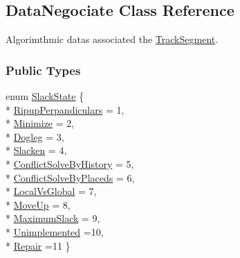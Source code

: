 \hypertarget{classKite_1_1DataNegociate}{\subsection{Data\-Negociate Class Reference}
\label{classKite_1_1DataNegociate}
}


Algorimthmic datas associated the \hyperlink{classKite_1_1TrackSegment}{Track\-Segment}.  


\subsubsection*{Public Types}
\begin{DoxyCompactItemize}
\item 
enum \hyperlink{classKite_1_1DataNegociate_ab7ccb6fc1f298728995250a3bbcf18c7}{Slack\-State} \{ \\*
\hyperlink{classKite_1_1DataNegociate_ab7ccb6fc1f298728995250a3bbcf18c7a19d8d157762b2b73c5274e4865523d29}{Ripup\-Perpandiculars} = 1, 
\\*
\hyperlink{classKite_1_1DataNegociate_ab7ccb6fc1f298728995250a3bbcf18c7a548e204a4e2ffae50774910737f11380}{Minimize} = 2, 
\\*
\hyperlink{classKite_1_1DataNegociate_ab7ccb6fc1f298728995250a3bbcf18c7a361bca46d5e7bdf02f50f7ecaa6018a9}{Dogleg} = 3, 
\\*
\hyperlink{classKite_1_1DataNegociate_ab7ccb6fc1f298728995250a3bbcf18c7a0d4bff02b3163821c0e5f7ad9dd55f36}{Slacken} = 4, 
\\*
\hyperlink{classKite_1_1DataNegociate_ab7ccb6fc1f298728995250a3bbcf18c7ae08187cba35efd6229ab8acfd003a600}{Conflict\-Solve\-By\-History} = 5, 
\\*
\hyperlink{classKite_1_1DataNegociate_ab7ccb6fc1f298728995250a3bbcf18c7afce071be0ba39626ed1c865789da598b}{Conflict\-Solve\-By\-Placeds} = 6, 
\\*
\hyperlink{classKite_1_1DataNegociate_ab7ccb6fc1f298728995250a3bbcf18c7aa54078da5ffb3463f7d6f291b0b0725e}{Local\-Vs\-Global} = 7, 
\\*
\hyperlink{classKite_1_1DataNegociate_ab7ccb6fc1f298728995250a3bbcf18c7adfd76a7d65b56ed7ecc0eedf921d6f82}{Move\-Up} = 8, 
\\*
\hyperlink{classKite_1_1DataNegociate_ab7ccb6fc1f298728995250a3bbcf18c7a9fc7197613f3435d906edf69a73acf38}{Maximum\-Slack} = 9, 
\\*
\hyperlink{classKite_1_1DataNegociate_ab7ccb6fc1f298728995250a3bbcf18c7ac64569bb9cffe0532bc43b52d7b6c383}{Unimplemented} =10, 
\\*
\hyperlink{classKite_1_1DataNegociate_ab7ccb6fc1f298728995250a3bbcf18c7a27b403019a93f9f127cf64a0688a8288}{Repair} =11
 \}
\end{DoxyCompactItemize}
